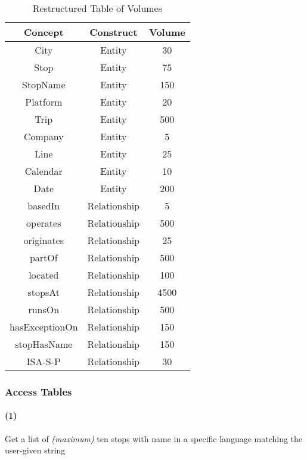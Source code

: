 	\begin{table}[h]
		\centering
		\begin{tabular}{|c|c|c|}
			\hline
			\textbf{Concept} & \textbf{Construct} & \textbf{Volume} \\
			\hline
			City & Entity & 30 \\ \hline
			Stop & Entity & 75 \\ \hline
			StopName & Entity & 150 \\ \hline
			Platform & Entity & 20 \\ \hline
			Trip & Entity & 500 \\ \hline
			Company & Entity & 5 \\ \hline
			Line & Entity & 25 \\ \hline
			Calendar & Entity & 10 \\ \hline
			Date & Entity & 200 \\ \hline
			basedIn & Relationship & 5 \\ \hline
			operates & Relationship & 500 \\ \hline
			originates & Relationship & 25 \\ \hline
			partOf & Relationship & 500 \\ \hline
			located & Relationship & 100 \\ \hline
			stopsAt & Relationship & 4500 \\ \hline
			runsOn & Relationship & 500 \\ \hline
			hasExceptionOn & Relationship & 150 \\ \hline
			stopHasName & Relationship & 150 \\ \hline
			ISA-S-P & Relationship & 30 \\ \hline
		\end{tabular}
		\caption{Restructured Table of Volumes}\label{tbl:volumes-rest}
	\end{table}

	\newpage
	\subsubsection{Access Tables}
	
	\paragraph{(1)} Get a list of \textit{(maximum)} ten stops with name in a specific language matching the user-given string
	
